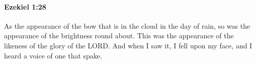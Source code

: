
		\paragraph{Ezekiel 1:28} %
			\label{EZEKIEL-1-28}

			As the appearance of the bow that is in the cloud in the day of rain, so was the appearance of the brightness round about. This was the appearance of the likeness of the glory of the LORD. And when I saw it, I fell upon my face, and I heard a voice of one that spake.

